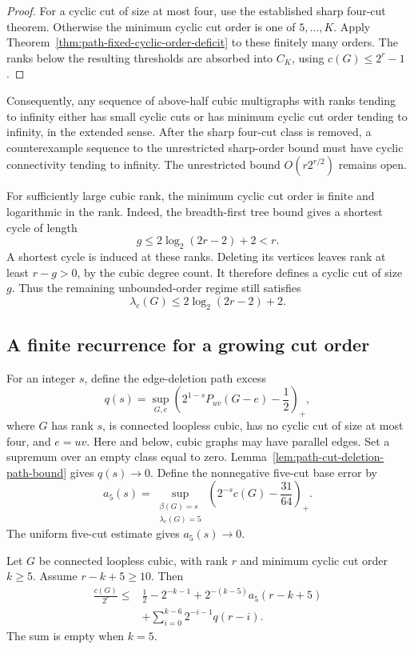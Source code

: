 \begin{proof}
For a cyclic cut of size at most four, use the established sharp four-cut theorem.
Otherwise the minimum cyclic cut order is one of $5,\ldots,K$.
Apply Theorem~\ref{thm:path-fixed-cyclic-order-deficit} to these finitely many orders.
The ranks below the resulting thresholds are absorbed into $C_K$, using $c(G)\le2^r-1$.
\end{proof}

Consequently, any sequence of above-half cubic multigraphs with ranks tending to infinity either has small cyclic cuts or has minimum cyclic cut order tending to infinity, in the extended sense.
After the sharp four-cut class is removed, a counterexample sequence to the unrestricted sharp-order bound must have cyclic connectivity tending to infinity.
The unrestricted bound $O(r2^{r/2})$ remains open.

For sufficiently large cubic rank, the minimum cyclic cut order is finite and logarithmic in the rank.
Indeed, the breadth-first tree bound gives a shortest cycle of length
\[
 g\le2\log_2(2r-2)+2<r.
\]
A shortest cycle is induced at these ranks.
Deleting its vertices leaves rank at least $r-g>0$, by the cubic degree count.
It therefore defines a cyclic cut of size $g$.
Thus the remaining unbounded-order regime still satisfies
\[
 \lambda_c(G)\le2\log_2(2r-2)+2.
\]

\subsection{A finite recurrence for a growing cut order}

For an integer $s$, define the edge-deletion path excess
\[
 q(s)=\sup_{G,e}\left(2^{1-s}P_{uv}(G-e)-\frac12\right)_+,
\]
where $G$ has rank $s$, is connected loopless cubic, has no cyclic cut of size at most four, and $e=uv$.
Here and below, cubic graphs may have parallel edges.
Set a supremum over an empty class equal to zero.
Lemma~\ref{lem:path-cut-deletion-path-bound} gives $q(s)\to0$.
Define the nonnegative five-cut base error by
\[
 a_5(s)=\sup_{\substack{\beta(G)=s\\\lambda_c(G)=5}}
 \left(2^{-s}c(G)-\frac{31}{64}\right)_+.
\]
The uniform five-cut estimate gives $a_5(s)\to0$.

\begin{proposition}
\label{prop:path-finite-cut-recurrence}
Let $G$ be connected loopless cubic, with rank $r$ and minimum cyclic cut order $k\ge5$.
Assume $r-k+5\ge10$.
Then
\begin{align*}
 \frac{c(G)}{2^r}
 \le{}&\frac12-2^{-k-1}
 +2^{-(k-5)}a_5(r-k+5)\\
 &+\sum_{i=0}^{k-6}2^{-i-1}q(r-i).
\end{align*}
The sum is empty when $k=5$.
\end{proposition}

